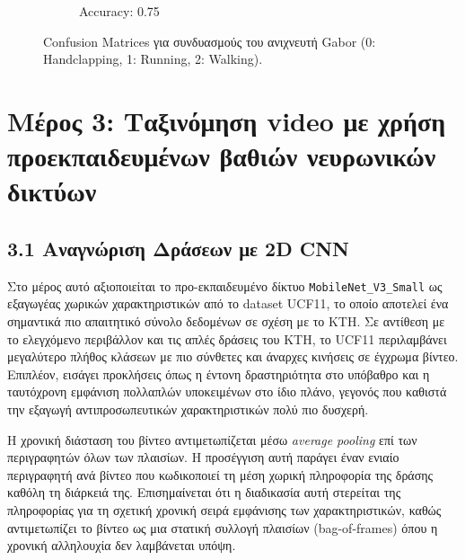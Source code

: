 \documentclass[12pt]{article}
\begin{document}
\begin{figure}[H]
\begin{subfigure}[b]{0.3\textwidth}
         \caption{Accuracy: 0.75}
     \end{subfigure}
     
     \caption{Confusion Matrices για συνδυασμούς του ανιχνευτή Gabor (0: Handclapping, 1: Running, 2: Walking).}
     \label{fig:confusion_matrices_gabor}
\end{figure}


\section*{Μέρος 3: Ταξινόμηση video με χρήση προεκπαιδευμένων βαθιών νευρωνικών δικτύων}
\subsection*{3.1 Αναγνώριση Δράσεων με 2D CNN}

\hspace{0.6cm}Στο μέρος αυτό αξιοποιείται το προ-εκπαιδευμένο δίκτυο \texttt{MobileNet\_V3\_Small} ως εξαγωγέας χωρικών χαρακτηριστικών από το dataset UCF11, το οποίο αποτελεί ένα σημαντικά πιο απαιτητικό σύνολο δεδομένων σε σχέση με το KTH. Σε αντίθεση με το ελεγχόμενο περιβάλλον και τις απλές δράσεις του KTH, το UCF11 περιλαμβάνει μεγαλύτερο πλήθος κλάσεων με πιο σύνθετες και άναρχες κινήσεις σε έγχρωμα βίντεο. Επιπλέον, εισάγει προκλήσεις όπως η έντονη δραστηριότητα στο υπόβαθρο και η ταυτόχρονη εμφάνιση πολλαπλών υποκειμένων στο ίδιο πλάνο, γεγονός που καθιστά την εξαγωγή αντιπροσωπευτικών χαρακτηριστικών πολύ πιο δυσχερή.

Η χρονική διάσταση του βίντεο αντιμετωπίζεται μέσω \textit{average pooling} επί των περιγραφητών όλων των πλαισίων. Η προσέγγιση αυτή παράγει έναν ενιαίο περιγραφητή ανά βίντεο που κωδικοποιεί τη μέση χωρική πληροφορία της δράσης καθόλη τη διάρκειά της. Επισημαίνεται ότι η διαδικασία αυτή στερείται της πληροφορίας για τη σχετική χρονική σειρά εμφάνισης των χαρακτηριστικών, καθώς αντιμετωπίζει το βίντεο ως μια στατική συλλογή πλαισίων (bag-of-frames) όπου η χρονική αλληλουχία δεν λαμβάνεται υπόψη.
\end{document}
